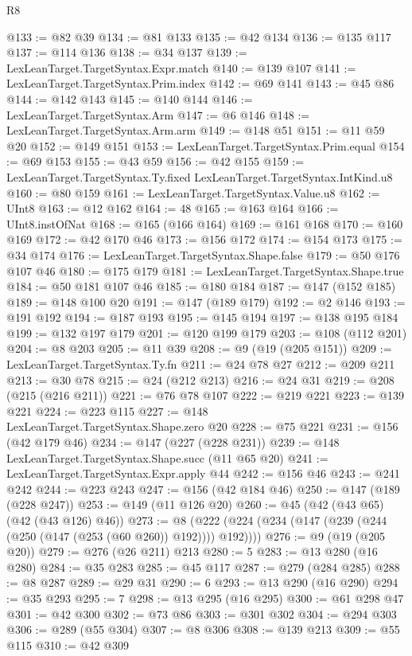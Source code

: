 \begin{lexlean}{R8}
\begin{coremodule}
@133 := @82 @39
@134 := @81 @133
@135 := @42 @134
@136 := @135 @117
@137 := @114 @136
@138 := @34 @137
@139 := LexLeanTarget.TargetSyntax.Expr.match
@140 := @139 @107
@141 := LexLeanTarget.TargetSyntax.Prim.index
@142 := @69 @141
@143 := @45 @86
@144 := @142 @143
@145 := @140 @144
@146 := LexLeanTarget.TargetSyntax.Arm
@147 := @6 @146
@148 := LexLeanTarget.TargetSyntax.Arm.arm
@149 := @148 @51
@151 := @11 @59 @20
@152 := @149 @151
@153 := LexLeanTarget.TargetSyntax.Prim.equal
@154 := @69 @153
@155 := @43 @59
@156 := @42 @155
@159 := LexLeanTarget.TargetSyntax.Ty.fixed LexLeanTarget.TargetSyntax.IntKind.u8
@160 := @80 @159
@161 := LexLeanTarget.TargetSyntax.Value.u8
@162 := UInt8
@163 := @12 @162
@164 := 48
@165 := @163 @164
@166 := UInt8.instOfNat
@168 := @165 (@166 @164)
@169 := @161 @168
@170 := @160 @169
@172 := @42 @170 @46
@173 := @156 @172
@174 := @154 @173
@175 := @34 @174
@176 := LexLeanTarget.TargetSyntax.Shape.false
@179 := @50 @176 @107 @46
@180 := @175 @179
@181 := LexLeanTarget.TargetSyntax.Shape.true
@184 := @50 @181 @107 @46
@185 := @180 @184
@187 := @147 (@152 @185)
@189 := @148 @100 @20
@191 := @147 (@189 @179)
@192 := @2 @146
@193 := @191 @192
@194 := @187 @193
@195 := @145 @194
@197 := @138 @195 @184
@199 := @132 @197 @179
@201 := @120 @199 @179
@203 := @108 (@112 @201)
@204 := @8 @203
@205 := @11 @39
@208 := @9 (@19 (@205 @151))
@209 := LexLeanTarget.TargetSyntax.Ty.fn
@211 := @24 @78 @27
@212 := @209 @211
@213 := @30 @78
@215 := @24 (@212 @213)
@216 := @24 @31
@219 := @208 (@215 (@216 @211))
@221 := @76 @78 @107
@222 := @219 @221
@223 := @139 @221
@224 := @223 @115
@227 := @148 LexLeanTarget.TargetSyntax.Shape.zero @20
@228 := @75 @221
@231 := @156 (@42 @179 @46)
@234 := @147 (@227 (@228 @231))
@239 := @148 LexLeanTarget.TargetSyntax.Shape.succ (@11 @65 @20)
@241 := LexLeanTarget.TargetSyntax.Expr.apply @44
@242 := @156 @46
@243 := @241 @242
@244 := @223 @243
@247 := @156 (@42 @184 @46)
@250 := @147 (@189 (@228 @247))
@253 := @149 (@11 @126 @20)
@260 := @45 (@42 (@43 @65) (@42 (@43 @126) @46))
@273 := @8 (@222 (@224 (@234 (@147 (@239 (@244 (@250 (@147 (@253 (@60 @260)) @192)))) @192))))
@276 := @9 (@19 (@205 @20))
@279 := @276 (@26 @211) @213
@280 := 5
@283 := @13 @280 (@16 @280)
@284 := @35 @283
@285 := @45 @117
@287 := @279 (@284 @285)
@288 := @8 @287
@289 := @29 @31
@290 := 6
@293 := @13 @290 (@16 @290)
@294 := @35 @293
@295 := 7
@298 := @13 @295 (@16 @295)
@300 := @61 @298 @47
@301 := @42 @300
@302 := @73 @86
@303 := @301 @302
@304 := @294 @303
@306 := @289 (@55 @304)
@307 := @8 @306
@308 := @139 @213
@309 := @55 @115
@310 := @42 @309

\end{coremodule}
\end{lexlean}
